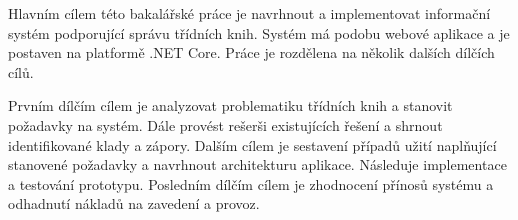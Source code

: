 Hlavním cílem této bakalářské práce je navrhnout a implementovat informační systém podporující správu třídních knih. Systém má podobu webové aplikace a je postaven na platformě .NET Core. Práce je rozdělena na několik dalších dílčích cílů. 

Prvním dílčím cílem je analyzovat problematiku třídních knih a stanovit požadavky na systém. Dále provést rešerši existujících řešení a shrnout identifikované klady a zápory. Dalším cílem je sestavení případů užití naplňující stanovené požadavky a navrhnout architekturu aplikace. Následuje implementace a testování prototypu. Posledním dílčím cílem je zhodnocení přínosů systému a odhadnutí nákladů na zavedení a provoz.
